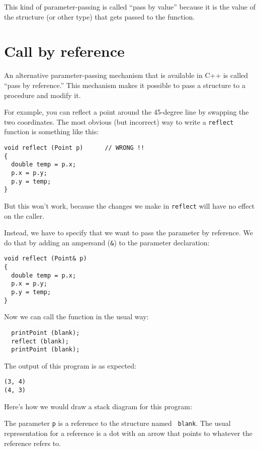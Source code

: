 This kind of parameter-passing is called ``pass by value''
because it is the value of the structure (or other type) that
gets passed to the function.

\section{Call by reference}
\label{reference}

An alternative parameter-passing mechanism that is available
in C++ is called ``pass by reference.''  This mechanism makes
it possible to pass a structure to a procedure and modify it.

For example, you can reflect a point around the 45-degree line by
swapping the two coordinates.  The most obvious (but incorrect) way to
write a {\tt reflect} function is something like this:

\begin{verbatim}
void reflect (Point p)      // WRONG !!
{
  double temp = p.x;
  p.x = p.y;
  p.y = temp;
}
\end{verbatim}
%
But this won't work, because the changes we make in {\tt reflect}
will have no effect on the caller.

Instead, we have to specify that we want to pass the parameter by
reference.  We do that by adding an ampersand ({\tt \&}) to the
parameter declaration:

\begin{verbatim}
void reflect (Point& p)
{
  double temp = p.x;
  p.x = p.y;
  p.y = temp;
}
\end{verbatim}
%
Now we can call the function in the usual way:

\begin{verbatim}
  printPoint (blank);
  reflect (blank);
  printPoint (blank);
\end{verbatim}
%
The output of this program is as expected:

\begin{verbatim}
(3, 4)
(4, 3)
\end{verbatim}
%
Here's how we would draw a stack diagram for this program:

\vspace{0.1in}
\centerline{}
\vspace{0.1in}
%
The parameter {\tt p} is a reference to the structure named {\tt
blank}.  The usual representation for a reference is a dot with an
arrow that points to whatever the reference refers to.

